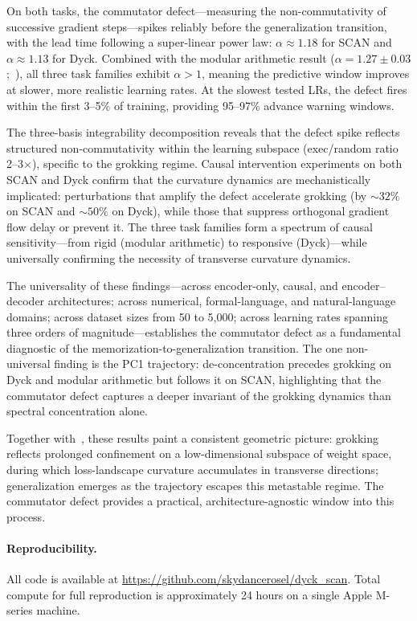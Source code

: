 \documentclass[11pt]{article}
\begin{document}
On both tasks, the commutator defect---measuring the non-commutativity of successive gradient steps---spikes reliably before the generalization transition, with the lead time following a super-linear power law: $\alpha \approx 1.18$ for SCAN and $\alpha \approx 1.13$ for Dyck. Combined with the modular arithmetic result ($\alpha = 1.27 \pm 0.03$;~\citealp{xu2026integrability}), all three task families exhibit $\alpha > 1$, meaning the predictive window improves at slower, more realistic learning rates. At the slowest tested LRs, the defect fires within the first 3--5\% of training, providing 95--97\% advance warning windows.

The three-basis integrability decomposition reveals that the defect spike reflects structured non-commutativity within the learning subspace (exec/random ratio 2--3$\times$), specific to the grokking regime. Causal intervention experiments on both SCAN and Dyck confirm that the curvature dynamics are mechanistically implicated: perturbations that amplify the defect accelerate grokking (by ${\sim}32\%$ on SCAN and ${\sim}50\%$ on Dyck), while those that suppress orthogonal gradient flow delay or prevent it. The three task families form a spectrum of causal sensitivity---from rigid (modular arithmetic) to responsive (Dyck)---while universally confirming the necessity of transverse curvature dynamics.

The universality of these findings---across encoder-only, causal, and encoder--decoder architectures; across numerical, formal-language, and natural-language domains; across dataset sizes from 50 to 5,000; across learning rates spanning three orders of magnitude---establishes the commutator defect as a fundamental diagnostic of the memorization-to-generalization transition. The one non-universal finding is the PC1 trajectory: de-concentration precedes grokking on Dyck and modular arithmetic but follows it on SCAN, highlighting that the commutator defect captures a deeper invariant of the grokking dynamics than spectral concentration alone.

Together with~\citet{xu2026integrability}, these results paint a consistent geometric picture: grokking reflects prolonged confinement on a low-dimensional subspace of weight space, during which loss-landscape curvature accumulates in transverse directions; generalization emerges as the trajectory escapes this metastable regime. The commutator defect provides a practical, architecture-agnostic window into this process.

\paragraph{Reproducibility.} All code is available at \url{https://github.com/skydancerosel/dyck_scan}. Total compute for full reproduction is approximately 24 hours on a single Apple M-series machine.
\end{document}
